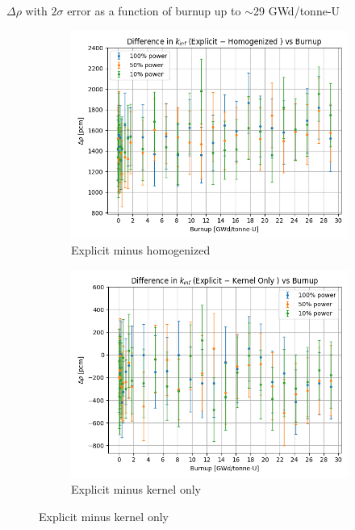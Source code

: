 \documentclass[9pt,t,aspectratio=169]{beamer}
\begin{document}
\begin{frame}{$\Delta \rho$ with $2\sigma$ error as a function of burnup  up to $\sim$29 GWd/tonne-U}
    \begin{figure}
        \centering
        \begin{subfigure}{0.495\linewidth}
            \centering
            \includegraphics[width=\linewidth]{figures/explicit_minus_homog.png}
            \caption{Explicit minus homogenized}
        \end{subfigure}
        \begin{subfigure}{0.495\linewidth}
            \centering
            \includegraphics[width=\linewidth]{figures/explicit_minus_kern.png}
            \caption{Explicit minus kernel only}
        \end{subfigure}
        \label{fig:pcm_diffs}
    \end{figure}
\end{frame}
\end{document}
